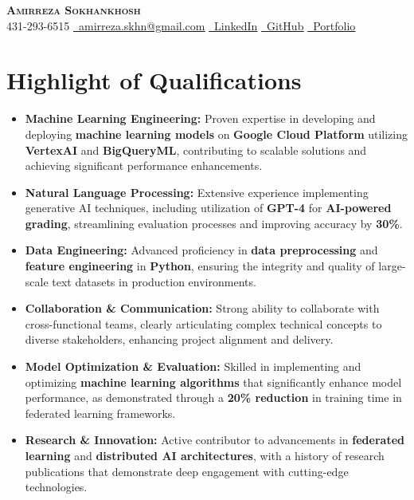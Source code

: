 \documentclass[letterpaper,11pt]{article}
\newcommand{\resumeItem}[1]{
  \item\small{
    #1 \vspace{0pt}
  }
}
\newcommand{\resumeItemListStart}{\begin{itemize}}
\newcommand{\resumeItemListEnd}{\end{itemize}\vspace{-5pt}}
\begin{document}


\begin{center}
    \textbf{\Huge \scshape Amirreza Sokhankhosh} \\ \vspace{1pt}
    \faPhone \small 431-293-6515 \quad
    \href{mailto:amirreza.skhn@gmail.com}{\faEnvelope \ \underline{amirreza.skhn@gmail.com}} \quad
    \href{https://www.linkedin.com/in/amirrezakh/}{\faLinkedin \ \underline{LinkedIn}} \quad
    \href{https://github.com/amirrezaskh}{\faGithub \ \underline{GitHub}} \quad
    \href{https://amirrezaskh.com}{\faBriefcase \ \underline{Portfolio}}
\end{center}

\section{Highlight of Qualifications}
\resumeItemListStart
\resumeItem{\textbf{Machine Learning Engineering:} Proven expertise in developing and deploying \textbf{machine learning models} on \textbf{Google Cloud Platform} utilizing \textbf{VertexAI} and \textbf{BigQueryML}, contributing to scalable solutions and achieving significant performance enhancements.}
\resumeItem{\textbf{Natural Language Processing:} Extensive experience implementing generative AI techniques, including utilization of \textbf{GPT-4} for \textbf{AI-powered grading}, streamlining evaluation processes and improving accuracy by \textbf{30\%}.}
\resumeItem{\textbf{Data Engineering:} Advanced proficiency in \textbf{data preprocessing} and \textbf{feature engineering} in \textbf{Python}, ensuring the integrity and quality of large-scale text datasets in production environments.}
\resumeItem{\textbf{Collaboration \& Communication:} Strong ability to collaborate with cross-functional teams, clearly articulating complex technical concepts to diverse stakeholders, enhancing project alignment and delivery.}
\resumeItem{\textbf{Model Optimization \& Evaluation:} Skilled in implementing and optimizing \textbf{machine learning algorithms} that significantly enhance model performance, as demonstrated through a \textbf{20\% reduction} in training time in federated learning frameworks.}
\resumeItem{\textbf{Research \& Innovation:} Active contributor to advancements in \textbf{federated learning} and \textbf{distributed AI architectures}, with a history of research publications that demonstrate deep engagement with cutting-edge technologies.}
\resumeItemListEnd
\end{document}
